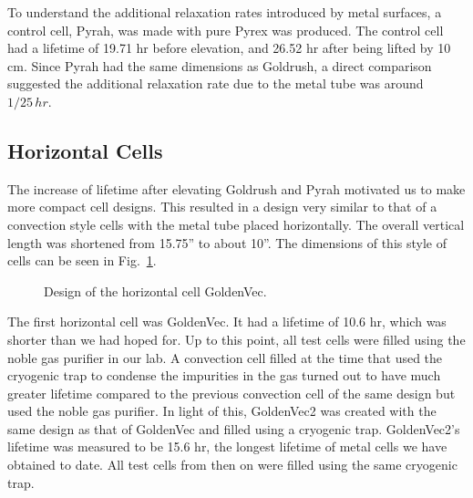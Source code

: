 To understand the additional relaxation rates introduced by metal surfaces, a control cell, Pyrah, was made with pure Pyrex was produced. The control cell had a lifetime of 19.71 hr before elevation, and 26.52 hr after being lifted by 10 cm. Since Pyrah had the same dimensions as Goldrush, a direct comparison suggested the additional relaxation rate due to the metal tube was around $1/25\,hr$.

\subsection{Horizontal Cells}

The increase of lifetime after elevating Goldrush and Pyrah motivated us to make more compact cell designs. This resulted in a design very similar to that of a convection style cells with the metal tube placed horizontally. The overall vertical length was shortened from 15.75'' to about 10''. The dimensions of this style of cells can be seen in Fig.~\ref{goldenvec}.

\begin{figure}[t!]
	\centering
	\caption{{Design of the horizontal cell GoldenVec.}}
	\label{goldenvec}
\end{figure}

The first horizontal cell was GoldenVec. It had a lifetime of 10.6 hr, which was shorter than we had hoped for. Up to this point, all test cells were filled using the noble gas purifier in our lab. A convection cell filled at the time that used the cryogenic trap to condense the impurities in the gas turned out to have much greater lifetime compared to the previous convection cell of the same design but used the noble gas purifier. In light of this, GoldenVec2 was created with the same design as that of GoldenVec and filled using a cryogenic trap. GoldenVec2's lifetime was measured to be 15.6 hr, the longest lifetime of metal cells we have obtained to date. All test cells from then on were filled using the same cryogenic trap.

